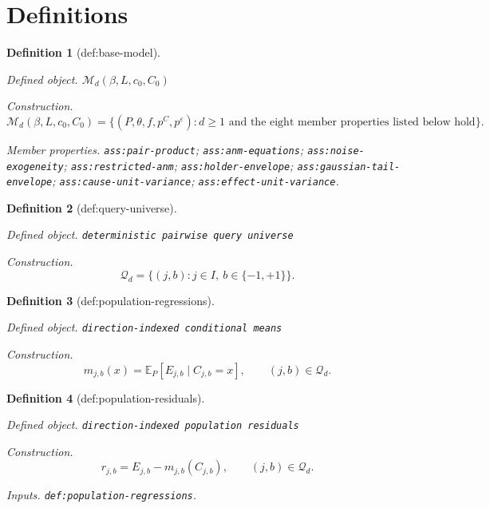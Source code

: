 \documentclass{article}
\newtheorem{definition}{Definition}
\begin{document}
\section{Definitions}

\begin{definition}[def:base-model]\label{def:base-model}
\par\smallskip\noindent\emph{Defined object.} \(\mathcal M_d(\beta,L,c_0,C_0)\)
\par\smallskip\noindent\emph{Construction.} \[\mathcal M_d(\beta,L,c_0,C_0)=\{(P,\theta,f,p^C,p^\varepsilon):d\ge1\text{ and the eight member properties listed below hold}\}.\]
\par\smallskip\noindent\emph{Member properties.} \texttt{ass:\allowbreak{}pair-\allowbreak{}product}; \texttt{ass:\allowbreak{}anm-\allowbreak{}equations}; \texttt{ass:\allowbreak{}noise-\allowbreak{}exogeneity}; \texttt{ass:\allowbreak{}restricted-\allowbreak{}anm}; \texttt{ass:\allowbreak{}holder-\allowbreak{}envelope}; \texttt{ass:\allowbreak{}gaussian-\allowbreak{}tail-\allowbreak{}envelope}; \texttt{ass:\allowbreak{}cause-\allowbreak{}unit-\allowbreak{}variance}; \texttt{ass:\allowbreak{}effect-\allowbreak{}unit-\allowbreak{}variance}.
\end{definition}

\begin{definition}[def:query-universe]\label{def:query-universe}
\par\smallskip\noindent\emph{Defined object.} \texttt{deterministic pairwise query universe}
\par\smallskip\noindent\emph{Construction.} \[\mathcal Q_d=\{(j,b):j\in I,\ b\in\{-1,+1\}\}.\]
\end{definition}

\begin{definition}[def:population-regressions]\label{def:population-regressions}
\par\smallskip\noindent\emph{Defined object.} \texttt{direction-\allowbreak{}indexed conditional means}
\par\smallskip\noindent\emph{Construction.} \[m_{j,b}(x)=\mathbb E_P[E_{j,b}\mid C_{j,b}=x],\qquad (j,b)\in\mathcal Q_d.\]
\end{definition}

\begin{definition}[def:population-residuals]\label{def:population-residuals}
\par\smallskip\noindent\emph{Defined object.} \texttt{direction-\allowbreak{}indexed population residuals}
\par\smallskip\noindent\emph{Construction.} \[r_{j,b}=E_{j,b}-m_{j,b}(C_{j,b}),\qquad (j,b)\in\mathcal Q_d.\]
\par\smallskip\noindent\emph{Inputs.} \texttt{def:\allowbreak{}population-\allowbreak{}regressions}.
\end{definition}
\end{document}
